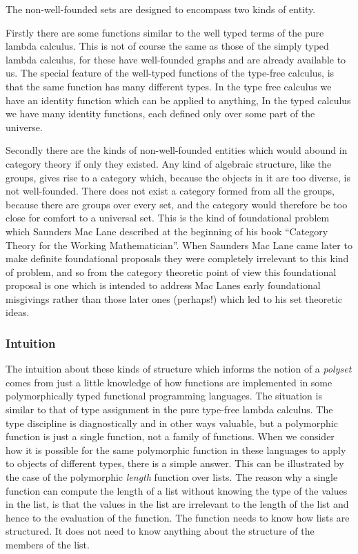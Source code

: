 \documentclass[numreferences]{rbjk}
\begin{document}
\begin{article}
The non-well-founded sets are designed to encompass two kinds of entity.

Firstly there are some functions similar to the well typed terms of the pure lambda calculus.
This is not of course the same as those of the simply typed lambda calculus, for these have well-founded graphs and are already available to us.
The special feature of the well-typed functions of the type-free calculus, is that the same function has many different types.
In the type free calculus we have an identity function which can be applied to anything,
In the typed calculus we have many identity functions, each defined only over some part of the universe.

Secondly there are the kinds of non-well-founded entities which would abound in category theory if only they existed.
Any kind of algebraic structure, like the groups, gives rise to a category which, because the objects in it are too diverse, is not well-founded.
There does not exist a category formed from all the groups, because there are groups over every set, and the category would therefore be too close for comfort to a universal set.
This is the kind of foundational problem which Saunders Mac Lane described at the beginning of his book ``Category Theory for the Working Mathematician''.
When Saunders Mac Lane came later to make definite foundational proposals they were completely irrelevant to this kind of problem, and so from the category theoretic point of view this foundational proposal is one which is intended to address Mac Lanes early foundational misgivings rather than those later ones (perhaps!) which led to his set theoretic ideas.

\subsubsection{Intuition}

The intuition about these kinds of structure which informs the notion of a \emph{polyset} comes from just a little knowledge of how functions are implemented in some polymorphically typed functional programming languages.
The situation is similar to that of type assignment in the pure type-free lambda calculus.
The type discipline is diagnostically and in other ways valuable, but a polymorphic function is just a single function, not a family of functions.
When we consider how it is possible for the same polymorphic function in these languages to apply to objects of different types, there is a simple answer.
This can be illustrated by the case of the polymorphic \emph{length} function over lists.
The reason why a single function can compute the length of a list without knowing the type of the values in the list, is that the values in the list are irrelevant to the length of the list and hence to the evaluation of the function.
The function needs to know how lists are structured.
It does not need to know anything about the structure of the members of the list.


\end{article}
\end{document}
